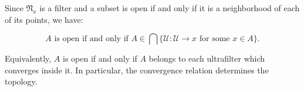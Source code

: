 Since $\mathfrak{N}_x$ is a filter and a subset is open if and only if it is a neighborhood of each of its points, we have:

$$A \text{ is open if and only if } A \in \bigcap\{\mathcal{U} : \mathcal{U} \longrightarrow x \text{ for some } x \in A\}.$$

Equivalently, $A$ is open if and only if $A$ belongs to each ultrafilter which converges inside it. In particular, the convergence relation determines the topology.
